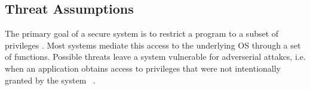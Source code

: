 

\subsection{Threat Assumptions}




The primary goal of a secure system is to restrict a program to a subset of privileges . Most systems mediate this access to the underlying OS through a set of functions. Possible threats leave  a system vulnerable for adverserial attakcs, i.e. when an application obtains access to privileges that were not intentionally granted by the system ~\cite{Repy-10}.

